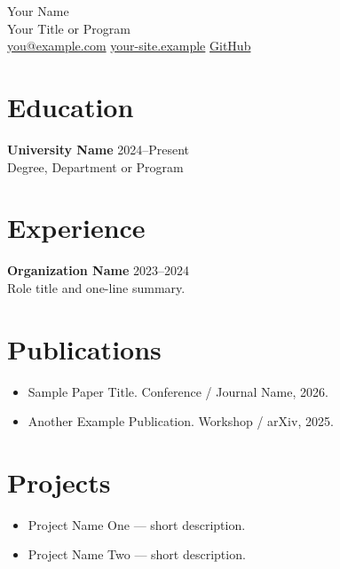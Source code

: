 \documentclass[11pt]{article}
\begin{document}
{\LARGE Your Name}\\
Your Title or Program\\
\href{mailto:you@example.com}{you@example.com} \quad
\href{https://your-site.example}{your-site.example} \quad
\href{https://github.com/your-github-username}{GitHub}

\vspace{1em}
\section*{Education}
\textbf{University Name} \hfill 2024--Present\\
Degree, Department or Program

\section*{Experience}
\textbf{Organization Name} \hfill 2023--2024\\
Role title and one-line summary.

\section*{Publications}
\begin{itemize}
  \item Sample Paper Title. Conference / Journal Name, 2026.
  \item Another Example Publication. Workshop / arXiv, 2025.
\end{itemize}

\section*{Projects}
\begin{itemize}
  \item Project Name One --- short description.
  \item Project Name Two --- short description.
\end{itemize}
\end{document}
